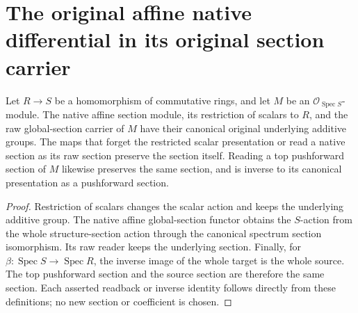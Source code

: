 \section{The original affine native differential in its original section carrier}

\begin{lemma}
\label{lem:kn-canonical-affine-native-readers}
\leanok
Let $R\to S$ be a homomorphism of commutative rings, and let $M$ be
an $\mathcal O_{\operatorname{Spec}S}$-module. The native affine section
module, its restriction of scalars to $R$, and the raw global-section
carrier of $M$ have their canonical original underlying additive groups.
The maps that forget the restricted scalar presentation or read a native
section as its raw section preserve the section itself. Reading a top
pushforward section of $M$ likewise preserves the same section, and is
inverse to its canonical presentation as a pushforward section.
\end{lemma}
\begin{proof}
Restriction of scalars changes the scalar action and keeps the underlying
additive group. The native affine global-section functor obtains the
$S$-action from the whole structure-section action through the canonical
spectrum section isomorphism. Its raw reader keeps the underlying section.
Finally, for $\beta:\operatorname{Spec}S\to\operatorname{Spec}R$,
the inverse image of the whole target is the whole source. The top
pushforward section and the source section are therefore the same
section. Each asserted readback or inverse identity follows directly
from these definitions; no new section or coefficient is chosen.
\end{proof}

